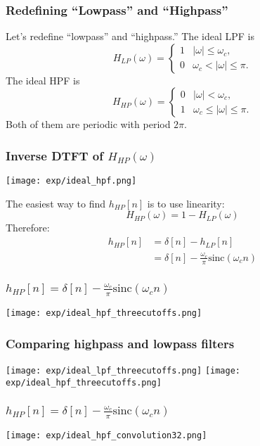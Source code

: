 \documentclass{beamer}
\begin{document}
\begin{frame}
  \frametitle{Redefining ``Lowpass'' and ``Highpass''}

  Let's redefine ``lowpass'' and ``highpass.''  The ideal LPF is
  \[
  H_{LP}(\omega)
  = \begin{cases} 1& |\omega|\le\omega_c,\\
    0 & \omega_c<|\omega|\le\pi.
  \end{cases}
  \]
  The ideal HPF is 
  \[
  H_{HP}(\omega)
  = \begin{cases} 0& |\omega|<\omega_c,\\
    1 & \omega_c\le |\omega|\le\pi.
  \end{cases}
  \]
  Both of them are periodic with period $2\pi$.
\end{frame}


\begin{frame}
  \frametitle{Inverse DTFT of $H_{HP}(\omega)$}

  \centerline{\texttt{[image: exp/ideal\_hpf.png]}}
  
  The easiest way to find $h_{HP}[n]$ is to use linearity:
  \[
  H_{HP}(\omega) = 1 - H_{LP}(\omega)
  \]
  Therefore:
  \begin{align*}
    h_{HP}[n] &= \delta[n] - h_{LP}[n]\\
    &= \delta[n] - \frac{\omega_c}{\pi}\mbox{sinc}(\omega_c n)
  \end{align*}
\end{frame}

\begin{frame}
  \frametitle{$h_{HP}[n]=\delta[n]-\frac{\omega_c}{\pi}\mbox{sinc}(\omega_c n)$}

  \centerline{\texttt{[image: exp/ideal\_hpf\_threecutoffs.png]}}

\end{frame}


\begin{frame}
  \frametitle{Comparing  highpass and lowpass filters}

  \texttt{[image: exp/ideal\_lpf\_threecutoffs.png]}
  \texttt{[image: exp/ideal\_hpf\_threecutoffs.png]}

\end{frame}


\begin{frame}
  \frametitle{$h_{HP}[n]=\delta[n]-\frac{\omega_c}{\pi}\mbox{sinc}(\omega_c n)$}

  \centerline{\texttt{[image: exp/ideal\_hpf\_convolution32.png]}}
\end{frame}
\end{document}
